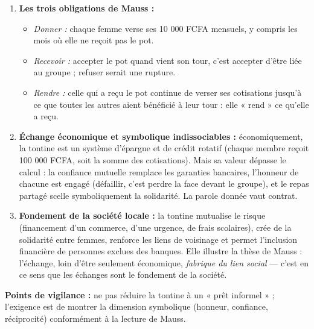 \documentclass[11pt]{article}
\begin{document}
\begin{corrige}
\begin{enumerate}
    \item \textbf{Les trois obligations de Mauss :}
    \begin{itemize}
        \item \emph{Donner :} chaque femme verse ses 10 000 FCFA mensuels, y compris les mois où elle ne reçoit pas le pot.
        \item \emph{Recevoir :} accepter le pot quand vient son tour, c'est accepter d'être liée au groupe ; refuser serait une rupture.
        \item \emph{Rendre :} celle qui a reçu le pot continue de verser ses cotisations jusqu'à ce que toutes les autres aient bénéficié à leur tour : elle « rend » ce qu'elle a reçu.
    \end{itemize}
    \item \textbf{Échange économique et symbolique indissociables :} économiquement, la tontine est un système d'épargne et de crédit rotatif (chaque membre reçoit 100 000 FCFA, soit la somme des cotisations). Mais sa valeur dépasse le calcul : la confiance mutuelle remplace les garanties bancaires, l'honneur de chacune est engagé (défaillir, c'est perdre la face devant le groupe), et le repas partagé scelle symboliquement la solidarité. La parole donnée vaut contrat.
    \item \textbf{Fondement de la société locale :} la tontine mutualise le risque (financement d'un commerce, d'une urgence, de frais scolaires), crée de la solidarité entre femmes, renforce les liens de voisinage et permet l'inclusion financière de personnes exclues des banques. Elle illustre la thèse de Mauss : l'échange, loin d'être seulement économique, \emph{fabrique du lien social} — c'est en ce sens que les échanges sont le fondement de la société.
\end{enumerate}
\textbf{Points de vigilance :} ne pas réduire la tontine à un « prêt informel » ; l'exigence est de montrer la dimension symbolique (honneur, confiance, réciprocité) conformément à la lecture de Mauss.
\end{corrige}
\end{document}
